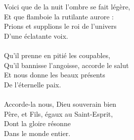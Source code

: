 Voici que de la nuit l'ombre se fait légère,\\
Et que flamboie la rutilante aurore :\\
Prions et supplions le roi de l'univers\\
D'une éclatante voix.\\
\\
Qu'il prenne en pitié les coupables,\\
Qu'il bannisse l'angoisse, accorde le salut\\
Et nous donne les beaux présents\\
De l'éternelle paix.\\
\\
Accorde-la nous, Dieu souverain bien\\
Père, et Fils, égaux au Saint-Esprit,\\
Dont la gloire résonne\\
Dans le monde entier.